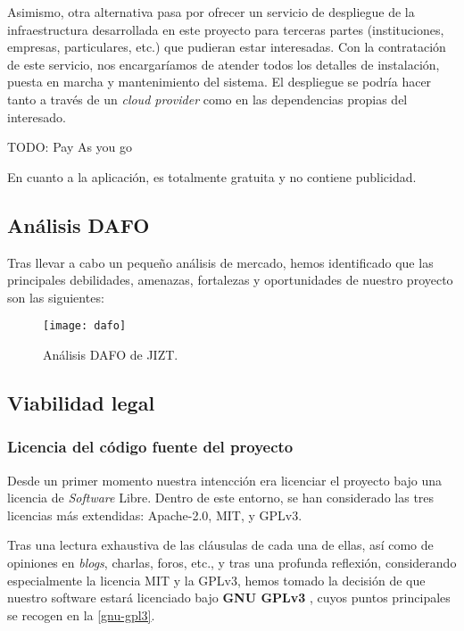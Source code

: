 Asimismo, otra alternativa pasa por ofrecer un servicio de despliegue de la infraestructura desarrollada en este proyecto para terceras partes (instituciones, empresas, particulares, etc.) que pudieran estar interesadas. Con la contratación de este servicio, nos encargaríamos de atender todos los detalles de instalación, puesta en marcha y mantenimiento del sistema. El despliegue se podría hacer tanto a través de un \emph{cloud provider} como en las dependencias propias del interesado.

TODO: Pay As you go

En cuanto a la aplicación, es totalmente gratuita y no contiene publicidad.

\newpage
\subsection{Análisis DAFO}

Tras llevar a cabo un pequeño análisis de mercado, hemos identificado que las principales debilidades, amenazas, fortalezas y oportunidades de nuestro proyecto son las siguientes:

\begin{figure}[h]
	\centering
	\texttt{[image: dafo]}
	\vspace{-0.5cm}
	\caption{Análisis DAFO de JIZT.}
\end{figure}

\subsection{Viabilidad legal}

\subsubsection{Licencia del código fuente del proyecto}

Desde un primer momento nuestra intencción era licenciar el proyecto bajo una licencia de \emph{Software} Libre. Dentro de este entorno, se han considerado las tres licencias más extendidas: Apache-2.0, MIT, y GPLv3.

Tras una lectura exhaustiva de las cláusulas de cada una de ellas, así como de opiniones en \emph{blogs}, charlas, foros, etc., y tras una profunda reflexión, considerando especialmente la licencia MIT y la GPLv3, hemos tomado la decisión de que nuestro software estará licenciado bajo \textbf{GNU GPLv3} \cite{gplv3}, cuyos puntos principales se recogen en la \autoref{gnu-gpl3}.

